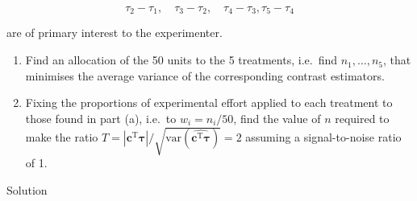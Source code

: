 \documentclass[
]{book}
\theoremstyle{definition}
\theoremstyle{definition}
\theoremstyle{definition}
\theoremstyle{definition}
\theoremstyle{remark}
\begin{document}
\[
\tau_2 - \tau_1, \quad \tau_3 - \tau_2, \quad \tau_4 - \tau_3, \tau_5 - \tau_4
\]

are of primary interest to the experimenter.

\begin{enumerate}
\def\labelenumi{\alph{enumi}.}
\item
  Find an allocation of the 50 units to the 5 treatments, i.e.~find \(n_1, \ldots, n_5\), that minimises the average variance of the corresponding contrast estimators.
\item
  Fixing the proportions of experimental effort applied to each treatment to those found in part (a), i.e.~to \(w_i = n_i/50\), find the value of \(n\) required to make the ratio \(T = |\boldsymbol{c}^{\mathrm{T}}\boldsymbol{\tau}|/\sqrt{\mbox{var}\left(\widehat{\boldsymbol{c}^{\mathrm{T}}\boldsymbol{\tau}}\right)} = 2\) assuming a signal-to-noise ratio of 1.
\end{enumerate}

Solution
\end{document}
